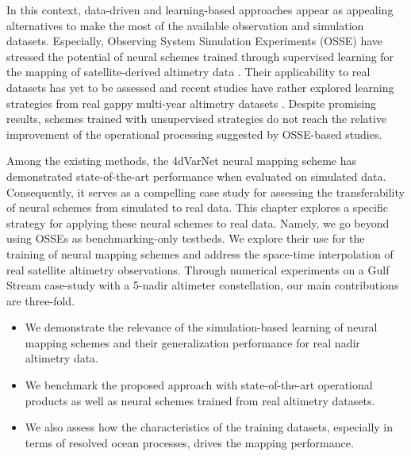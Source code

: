 \begin{bibunit}
  In this context, data-driven and learning-based approaches \cite{alveraazcarateReconstructionIncompleteOceanographic2005,barthDINCAEMultivariateConvolutional2022,lguensatAnalogDataAssimilation2017,fabletENDTOENDPHYSICSINFORMEDREPRESENTATION2021,martinSynthesizingSeaSurface2023} appear as appealing alternatives to make the most of the available observation and simulation datasets. Especially, Observing System Simulation Experiments (OSSE) have stressed the potential of neural schemes trained through supervised learning for the mapping of satellite-derived altimetry data \cite{fabletENDTOENDPHYSICSINFORMEDREPRESENTATION2021,beauchamp4DVarNetSSHEndtoendLearning2023}. 
  Their applicability to real datasets has yet to be assessed and recent studies have rather explored learning strategies from real gappy multi-year altimetry datasets \cite{martinSynthesizingSeaSurface2023}. Despite promising results, schemes trained with unsupervised strategies do not reach the relative improvement of the operational processing suggested by OSSE-based studies.

  Among the existing methods, the 4dVarNet neural mapping scheme has demonstrated state-of-the-art performance when evaluated on simulated data. Consequently, it serves as a compelling case study for assessing the transferability of neural schemes from simulated to real data. This chapter explores a specific strategy for applying these neural schemes to real data.
Namely, we go beyond using OSSEs as benchmarking-only testbeds. We explore their use for the training of neural mapping schemes and address the space-time interpolation of real satellite altimetry observations. Through numerical experiments on a Gulf Stream case-study with a 5-nadir altimeter constellation, our main contributions are three-fold.
\begin{itemize}
\item{We demonstrate the relevance of the simulation-based learning of neural mapping schemes and their generalization performance for real nadir altimetry data.}
\item{We benchmark the proposed approach with state-of-the-art operational products as well as neural schemes trained from real altimetry datasets.}
\item{We also assess how the characteristics of the training datasets, especially in terms of resolved ocean processes, drives the mapping performance.}
\end{itemize}  





\end{bibunit}
